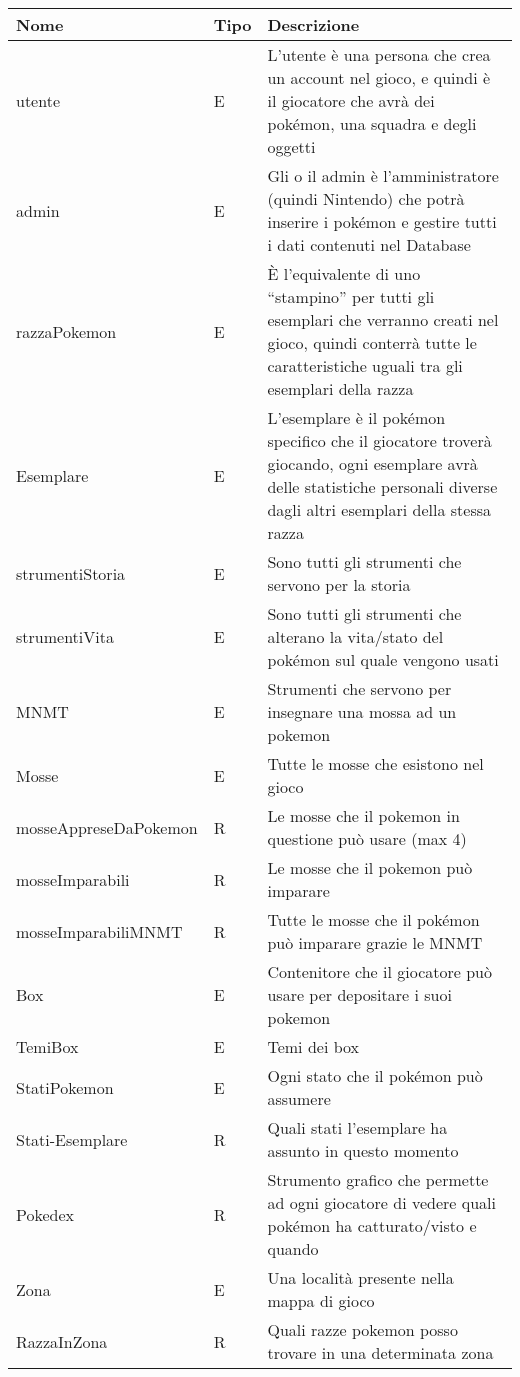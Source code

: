 \documentclass{article}
\begin{document}
\begin{table}[htbp]
\centering
\begin{tabular}{|l|l|p{7cm}|}
\hline
Nome & Tipo & Descrizione \\
\hline
utente & E & L’utente è una persona che crea un account nel gioco, e quindi è il giocatore che avrà dei pokémon, una squadra e degli oggetti \\
admin & E & Gli o il admin è l’amministratore (quindi Nintendo) che potrà inserire i pokémon e gestire tutti i dati contenuti nel Database \\
\hline
razzaPokemon & E & È l’equivalente di uno “stampino” per tutti gli esemplari che verranno creati nel gioco, quindi conterrà tutte le caratteristiche uguali tra gli esemplari della razza \\
Esemplare & E & L’esemplare è il pokémon specifico che il giocatore troverà giocando, ogni esemplare avrà delle statistiche personali diverse dagli altri esemplari della stessa razza \\
strumentiStoria & E & Sono tutti gli strumenti che servono per la storia \\
strumentiVita & E & Sono tutti gli strumenti che alterano la vita/stato del pokémon sul quale vengono usati \\
MNMT & E & Strumenti che servono per insegnare una mossa ad un pokemon \\
Mosse & E & Tutte le mosse che esistono nel gioco \\
mosseAppreseDaPokemon & R & Le mosse che il pokemon in questione può usare (max 4) \\
mosseImparabili & R & Le mosse che il pokemon può imparare \\
mosseImparabiliMNMT & R & Tutte le mosse che il pokémon può imparare grazie le MNMT \\
Box & E & Contenitore che il giocatore può usare per depositare i suoi pokemon \\
TemiBox & E & Temi dei box \\
StatiPokemon & E & Ogni stato che il pokémon può assumere \\
Stati-Esemplare & R & Quali stati l’esemplare ha assunto in questo momento \\
Pokedex & R & Strumento grafico che permette ad ogni giocatore di vedere quali pokémon ha catturato/visto e quando \\
Zona & E & Una località presente nella mappa di gioco \\
RazzaInZona & R & Quali razze pokemon posso trovare in una determinata zona \\

\end{tabular}
\end{table}
\end{document}
